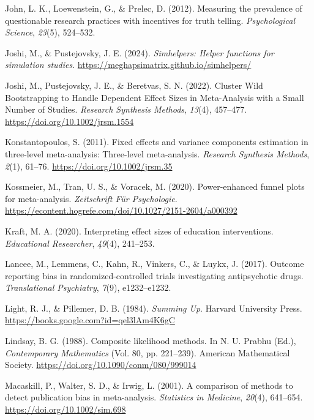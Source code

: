 \documentclass[
  man, donotrepeattitle,floatsintext]{apa7}
\newlength{\cslhangindent}
\newenvironment{CSLReferences}[2] %
 {\begin{list}{}{%
  \setlength{\itemindent}{0pt}
  \setlength{\leftmargin}{0pt}
  \setlength{\parsep}{0pt}
  \ifodd #1
   \setlength{\leftmargin}{\cslhangindent}
   \setlength{\itemindent}{-1\cslhangindent}
  \fi
  \setlength{\itemsep}{#2\baselineskip}}}
 {\end{list}}
\begin{document}
\begin{CSLReferences}{1}{0}
John, L. K., Loewenstein, G., \& Prelec, D. (2012). Measuring the prevalence of questionable research practices with incentives for truth telling. \emph{Psychological Science}, \emph{23}(5), 524--532.

Joshi, M., \& Pustejovsky, J. E. (2024). \emph{Simhelpers: Helper functions for simulation studies}. \url{https://meghapsimatrix.github.io/simhelpers/}

Joshi, M., Pustejovsky, J. E., \& Beretvas, S. N. (2022). Cluster Wild Bootstrapping to Handle Dependent Effect Sizes in Meta-Analysis with a Small Number of Studies. \emph{Research Synthesis Methods}, \emph{13}(4), 457--477. \url{https://doi.org/10.1002/jrsm.1554}

Konstantopoulos, S. (2011). Fixed effects and variance components estimation in three-level meta-analysis: {Three}-level meta-analysis. \emph{Research Synthesis Methods}, \emph{2}(1), 61--76. \url{https://doi.org/10.1002/jrsm.35}

Kossmeier, M., Tran, U. S., \& Voracek, M. (2020). Power-enhanced funnel plots for meta-analysis. \emph{Zeitschrift Für Psychologie}. \url{https://econtent.hogrefe.com/doi/10.1027/2151-2604/a000392}

Kraft, M. A. (2020). Interpreting effect sizes of education interventions. \emph{Educational Researcher}, \emph{49}(4), 241--253.

Lancee, M., Lemmens, C., Kahn, R., Vinkers, C., \& Luykx, J. (2017). Outcome reporting bias in randomized-controlled trials investigating antipsychotic drugs. \emph{Translational Psychiatry}, \emph{7}(9), e1232--e1232.

Light, R. J., \& Pillemer, D. B. (1984). \emph{Summing {Up}}. {Harvard University Press}. \url{https://books.google.com?id=qel3lAm4K6gC}

Lindsay, B. G. (1988). Composite likelihood methods. In N. U. Prabhu (Ed.), \emph{Contemporary {Mathematics}} (Vol. 80, pp. 221--239). American Mathematical Society. \url{https://doi.org/10.1090/conm/080/999014}

Macaskill, P., Walter, S. D., \& Irwig, L. (2001). A comparison of methods to detect publication bias in meta-analysis. \emph{Statistics in Medicine}, \emph{20}(4), 641--654. \url{https://doi.org/10.1002/sim.698}


\end{CSLReferences}
\end{document}
